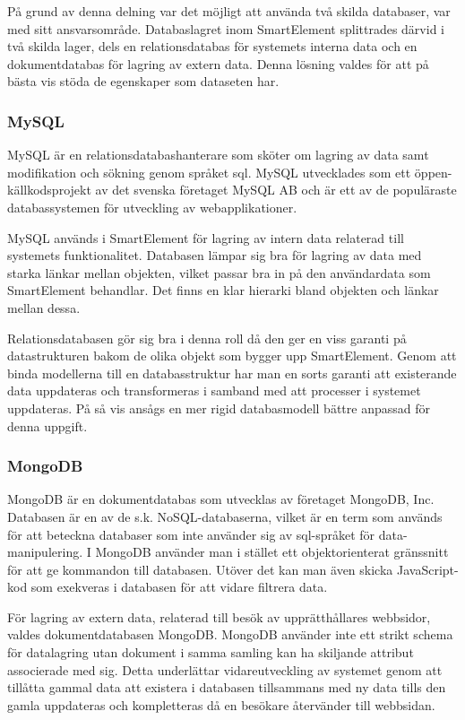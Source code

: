 På grund av denna delning var det möjligt att använda två skilda databaser, var med sitt ansvarsområde. Databaslagret inom SmartElement splittrades därvid i två skilda lager, dels en relationsdatabas för systemets interna data och en dokumentdatabas för lagring av extern data. Denna lösning valdes för att på bästa vis stöda de egenskaper som dataseten har.

\subsubsection{MySQL}

MySQL är en relationsdatabashanterare som sköter om lagring av data samt modifikation och sökning genom språket \gls{sql}. MySQL utvecklades som ett öppen-källkodsprojekt av det svenska företaget MySQL AB och är ett av de populäraste databassystemen för utveckling av webapplikationer. \citep{dbengines}

MySQL används i SmartElement för lagring av intern data relaterad till systemets funktionalitet. Databasen lämpar sig bra för lagring av data med starka länkar mellan objekten, vilket passar bra in på den användardata som SmartElement behandlar. Det finns en klar hierarki bland objekten och länkar mellan dessa.

Relationsdatabasen gör sig bra i denna roll då den ger en viss garanti på datastrukturen bakom de olika objekt som bygger upp SmartElement. Genom att binda modellerna till en databasstruktur har man en sorts garanti att existerande data uppdateras och transformeras i samband med att processer i systemet uppdateras. På så vis ansågs en mer rigid databasmodell bättre anpassad för denna uppgift.

\subsubsection{MongoDB}

MongoDB är en dokumentdatabas som utvecklas av företaget MongoDB, Inc. Databasen är en av de s.k. NoSQL-databaserna, vilket är en term som används för att beteckna databaser som inte använder sig av \gls{sql}-språket för data-manipulering. I MongoDB använder man i stället ett objektorienterat gränssnitt för att ge kommandon till databasen. Utöver det kan man även skicka JavaScript-kod som exekveras i databasen för att vidare filtrera data. \citep{mongoquery}

För lagring av extern data, relaterad till besök av upprätthållares webbsidor, valdes dokumentdatabasen MongoDB. MongoDB använder inte ett strikt schema för datalagring utan dokument i samma samling kan ha skiljande attribut associerade med sig. Detta underlättar vidareutveckling av systemet genom att tillåtta gammal data att existera i databasen tillsammans med ny data tills den gamla uppdateras och kompletteras då en besökare återvänder till webbsidan.

